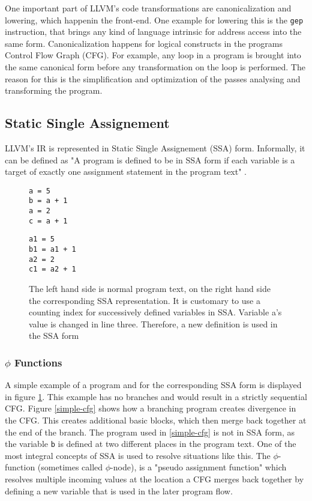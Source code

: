 One important part of LLVM's code transformations are canonicalization and lowering, which happenin the front-end. One example for lowering this is the \verb|gep| instruction, that brings any kind of language intrinsic for address access into the same form. Canonicalization happens for logical constructs in the programs Control Flow Graph (CFG). For example, any loop in a program is brought into the same canonical form before any transformation on the loop is performed.
The reason for this is the simplification and optimization of the passes analysing and transforming the program. 
\cite{llvm-passes}
\subsection{Static Single Assignement}
LLVM's IR is represented in Static Single Assignement (SSA) form. Informally, it can be defined as
"A program is defined to be in SSA form if each variable is a target of exactly one assignment
statement in the program text" \cite[p. 6]{Rastello:2016:SCD:3002539}.
\begin{figure}[t]
	\begin{minipage}{0.43\textwidth}	
\begin{lstlisting}[style=c]
a = 5
b = a + 1
a = 2
c = a + 1
\end{lstlisting}
	\end{minipage}\hfill
	\begin{minipage}{0.5\textwidth}
\begin{lstlisting}[style=c]
a1 = 5
b1 = a1 + 1
a2 = 2
c1 = a2 + 1
\end{lstlisting}
	\end{minipage}\hfill
	\caption{The left hand side is normal program text, on the right hand side the corresponding SSA representation. It is customary to use a counting index for successively defined variables in SSA. Variable a's value is changed in line three. Therefore, a new definition is used in the SSA form}
	\label{simpleSSA}
\end{figure}
\subsubsection{$\phi$ Functions}
A simple example of a program and for the corresponding SSA form  is displayed in figure \ref{simpleSSA}.
This example has no branches and would result in a strictly sequential CFG.
Figure \ref{simple-cfg} shows how a branching program creates divergence in the CFG. This creates additional basic blocks,
which then merge back together at the end of the branch. The program used in \ref{simple-cfg} is not in SSA form, as the variable \verb|b| is defined at two different places in the program text. One of the most integral concepts of SSA is used to resolve situations like this.
The $\phi$-function (sometimes called $\phi$-node), is a "pseudo assignment function"\cite{ssabook} which resolves multiple incoming values
at the location a CFG merges back together by defining a new variable that is used in the later program flow.
\cite{Rastello:2016:SCD:3002539}

